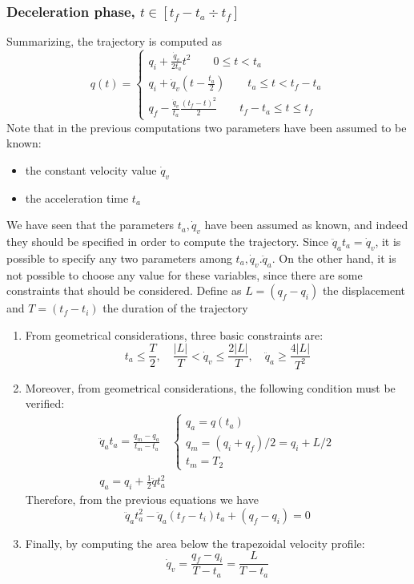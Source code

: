 \documentclass{book}
\begin{document}
\subsubsection{Deceleration phase, $t\in[t_f-t_a\div t_f]$}
Summarizing, the trajectory is computed as 
\[
  q(t)=\begin{cases}
    q_i+\displaystyle\frac{\dot{q}_v}{2t_a}t^2 \qquad 0\leq t<t_a\\
    q_i + \dot{q}_v\left(t-\displaystyle\frac{t_a}{2}\right) \qquad t_a\leq t<t_f-t_a\\
    q_f-\displaystyle\frac{\dot{q}_v}{t_a}\displaystyle\frac{(t_f-t)^2}{2} \qquad t_f-t_a\leq t \leq t_f
  \end{cases}
\]
Note that in the previous computations two parameters have been assumed to be known: 
\begin{itemize}
  \item the constant velocity value $\dot{q}_v$ 
  \item the acceleration time $t_a$
\end{itemize}
We have seen that the parameters $t_a,\dot{q}_v$ have been assumed as known, and indeed they should be specified in order to compute the trajectory. Since $\ddot{q}_at_a=\dot{q}_v$, it is possible to specify any two parameters among $t_a, \dot{q}_v. \ddot{q}_a$. On the other hand, it is not possible to choose any value for these variables, since there are some constraints that should be considered. Define as $L=(q_f-q_i)$ the displacement and $T=(t_f-t_i)$ the duration of the trajectory 
\begin{enumerate}
  \item From geometrical considerations, three basic constraints are: 
    \[
      t_a\leq \displaystyle\frac{T}{2}, \quad \displaystyle\frac{|L|}{T}<\dot{q}_v\leq\displaystyle\frac{2|L|}{T}, \quad \ddot{q}_a \geq \displaystyle\frac{4|L|}{T^2}
    \]
  \item Moreover, from geometrical considerations, the following condition must be verified: 
    \begin{gather*}
      \ddot{q}_at_a = \displaystyle\frac{q_m-q_a}{t_m-t_a}\quad\begin{cases}
        q_a = q(t_a)\\
        q_m = (q_i+q_f)/2=q_i+L/2\\
        t_m = T_2
      \end{cases}\\
      q_a = q_i + \displaystyle\frac{1}{2}\ddot{q}t_a^2
    \end{gather*}
    Therefore, from the previous equations we have
    \begin{equation} \label{trap1}
      \ddot{q}_at_a^2-\ddot{q}_a(t_f-t_i)t_a + (q_f-q_i)=0
    \end{equation}
    \item Finally, by computing the area below the trapezoidal velocity profile: 
      \[
        \dot{q}_v = \displaystyle\frac{q_f-q_i}{T-t_a}=\displaystyle\frac{L}{T-t_a}
      \]
\end{enumerate}
\end{document}
